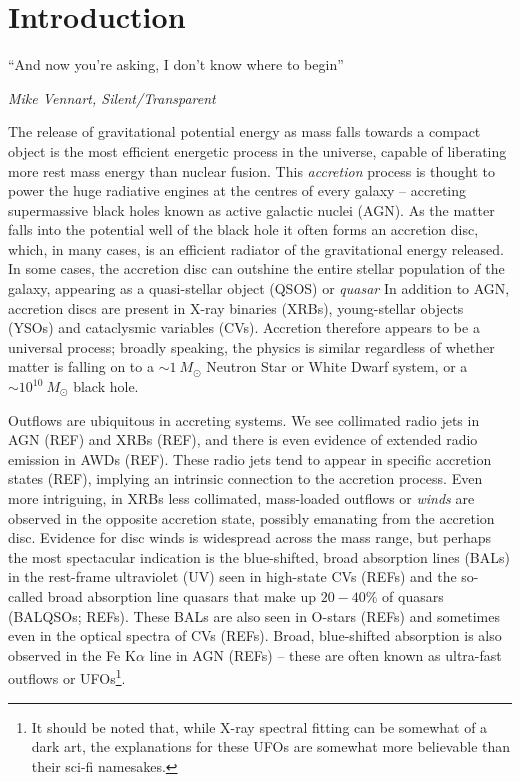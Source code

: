 \chapter{Introduction}

\epigraph{``And now you're asking, I don't know where to begin''}{{\sl Mike Vennart, Silent/Transparent}}
%

The release of gravitational potential energy as mass falls towards
a compact object is the most efficient energetic process in the universe,
capable of liberating more rest mass energy than nuclear fusion.
This {\em accretion} process is thought to power the huge radiative engines at the 
centres of every galaxy -- accreting supermassive black holes known as active galactic nuclei (AGN).
As the matter falls into the potential well of the black hole it often forms an accretion disc,
which, in many cases, is an efficient radiator of the gravitational energy released.
In some cases, the accretion disc can outshine the entire stellar population of the galaxy,
appearing as a quasi-stellar object (QSOS) or {\em quasar} 
In addition to AGN, accretion discs are present in X-ray binaries (XRBs), young-stellar objects (YSOs) and
cataclysmic variables (CVs). Accretion therefore appears to be a universal process; 
broadly speaking, the physics is similar regardless of 
whether matter is falling on to a $\sim1~M_\odot$ Neutron Star or White Dwarf 
system, or a $\sim10^{10}~M_\odot$ black hole. 

Outflows are ubiquitous in accreting systems. We see collimated radio jets in AGN (REF) and
XRBs (REF), and there is even evidence of extended radio emission in AWDs (REF). These radio jets
tend to appear in specific accretion states (REF), implying an intrinsic connection to the 
accretion process. Even more intriguing, in XRBs less collimated, mass-loaded outflows
or {\em winds} are observed in the opposite accretion state, possibly emanating from the accretion disc.
Evidence for disc winds is widespread across the mass range, but perhaps the most spectacular indication
is the blue-shifted, broad absorption lines (BALs) in the rest-frame ultraviolet (UV)
seen in high-state CVs (REFs) 
and the so-called broad absorption line quasars that make up $20-40\%$
of quasars (BALQSOs; REFs). These BALs are also seen in O-stars (REFs) and sometimes even
in the optical spectra of CVs (REFs). 
Broad, blue-shifted absorption is also observed in the Fe K$\alpha$ line in 
AGN (REFs) -- these are often known
as ultra-fast outflows or UFOs\footnote{It should be noted that, while X-ray spectral
fitting can be somewhat of a dark art, the explanations for these
UFOs are somewhat more believable than their sci-fi namesakes.}.

